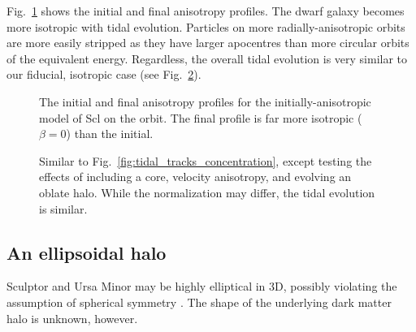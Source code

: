 Fig.~\ref{fig:anisotropy_i_f} shows the initial and final anisotropy
profiles. The dwarf galaxy becomes more isotropic with tidal evolution.
Particles on more radially-anisotropic orbits are more easily stripped
as they have larger apocentres than more circular orbits of the
equivalent energy. Regardless, the overall tidal evolution is very
similar to our fiducial, isotropic case (see
Fig.~\ref{fig:tidal_tracks_structure}).

\begin{figure}
\centering
{}
\caption[Tidal evolution of anisotropy]{The initial and final anisotropy
profiles for the initially-anisotropic model of Scl on the \smallperi{}
orbit. The final profile is far more isotropic (\(\beta=0\)) than the
initial.}\label{fig:anisotropy_i_f}
\end{figure}

\begin{figure}
\centering
{}
\caption[Tidal dependence on halo structure]{Similar to
Fig.~\ref{fig:tidal_tracks_concentration}, except testing the effects of
including a core, velocity anisotropy, and evolving an oblate halo.
While the normalization may differ, the tidal evolution is
similar.}\label{fig:tidal_tracks_structure}
\end{figure}

\subsection{An ellipsoidal halo}\label{an-ellipsoidal-halo}

Sculptor and Ursa Minor may be highly elliptical in 3D, possibly
violating the assumption of spherical symmetry
\citep[e.g.,][]{an+koposov2022}. The shape of the underlying dark matter
halo is unknown, however.

